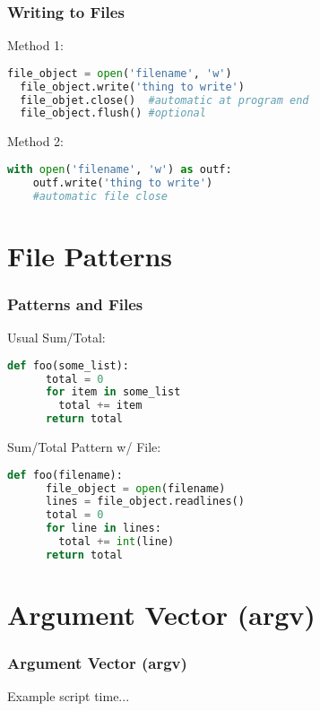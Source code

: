 \documentclass{beamer}
\begin{document}
%
%
\begin{frame}[fragile]
  \frametitle{Writing to Files}
  Method 1:
  \begin{lstlisting}[language=Python, autogobble]
  file_object = open('filename', 'w')
  file_object.write('thing to write')
  file_objet.close()  #automatic at program end
  file_object.flush() #optional
  \end{lstlisting}
  \vfill
  Method 2:
  \begin{lstlisting}[language=Python, autogobble]
  with open('filename', 'w') as outf:
    outf.write('thing to write')
    #automatic file close
  \end{lstlisting}
\end{frame}

\section{File Patterns}

%
%
\begin{frame}[fragile]
  \frametitle{Patterns and Files}
  \begin{minipage}{0.38\textwidth}
    Usual Sum/Total:
    \begin{lstlisting}[language=Python, autogobble]
    def foo(some_list):
      total = 0
      for item in some_list
        total += item
      return total
    \end{lstlisting}
  \end{minipage}
  \hfill
  \begin{minipage}{0.58\textwidth}
    Sum/Total Pattern w/ File:
    \begin{lstlisting}[language=Python, autogobble]
    def foo(filename):
      file_object = open(filename)
      lines = file_object.readlines()
      total = 0
      for line in lines:
        total += int(line)
      return total
    \end{lstlisting}
  \end{minipage}
\end{frame}

\section{Argument Vector (argv)}

%
%
\begin{frame}[fragile]
  \frametitle{Argument Vector (argv)}
  Example script time...
\end{frame}
\end{document}
